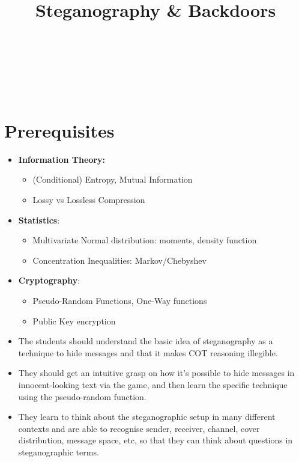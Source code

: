 \documentclass[11pt]{article}
\title{Steganography \& Backdoors}
\author{
  \authorname{Stephan Wäldchen}\\
  \affiliation{Independent}
  \and
  \authorname{Louis Jaburi}\\
  \affiliation{EleutherAI}
  \and
  \authorname{Julian Schulz}\\
  \affiliation{Meridian Research}
}
\date{}
\begin{document}
\maketitle

\section{Prerequisites}
\label{sec:prereqs}

\begin{itemize}
  \item \textbf{Information Theory:}
  \begin{itemize}
    \item (Conditional) Entropy, Mutual Information
    \item Lossy vs Lossless Compression
  \end{itemize}
  \item \textbf{Statistics}:
  \begin{itemize}
    \item Multivariate Normal distribution: moments, density function
    \item Concentration Inequalities: Markov/Chebyshev
  \end{itemize}
  \item \textbf{Cryptography}:
  \begin{itemize}
    \item Pseudo-Random Functions, One-Way functions
    \item Public Key encryption
  \end{itemize}
\end{itemize}

\begin{learningoutcomes}
\begin{itemize}
  \item The students should understand the basic idea of steganography as a
        technique to hide messages and that it makes COT reasoning illegible.
  \item They should get an intuitive grasp on how it's possible to hide
        messages in innocent-looking text via the game, and then learn the
        specific technique using the pseudo-random function.
  \item They learn to think about the steganographic setup in many different
        contexts and are able to recognise sender, receiver, channel, cover
        distribution, message space, etc, so that they can think about
        questions in steganographic terms.
\end{itemize}
\end{learningoutcomes}
\end{document}
